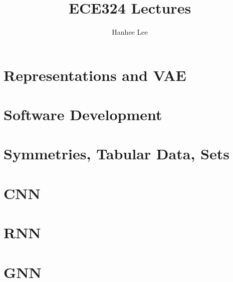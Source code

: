 \documentclass{article}
\title{ECE324 Lectures}
\author{Hanhee Lee}
\begin{document}
\section{Representations and VAE}

\newpage

\section{Software Development}

\newpage

\section{Symmetries, Tabular Data, Sets}

\newpage

\section{CNN}

\newpage

\section{RNN}

\newpage

\section{GNN}

\end{document}
